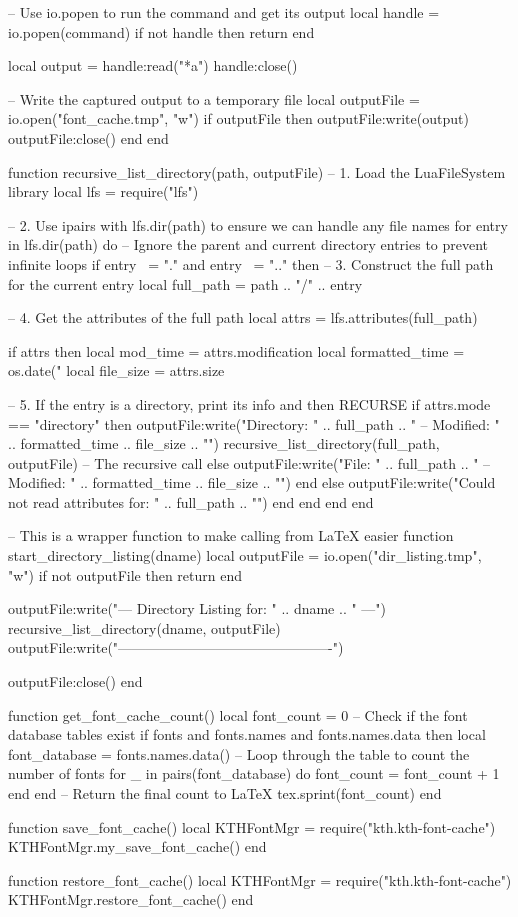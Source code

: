\begin{luacode*}
  -- Use io.popen to run the command and get its output
  local handle = io.popen(command)
  if not handle then return end
  
  local output = handle:read("*a")
  handle:close()
  
  -- Write the captured output to a temporary file
  local outputFile = io.open("font_cache.tmp", "w")
  if outputFile then
    outputFile:write(output)
    outputFile:close()
  end
end

function recursive_list_directory(path, outputFile)
  -- 1. Load the LuaFileSystem library
  local lfs = require("lfs")
  
  -- 2. Use ipairs with lfs.dir(path) to ensure we can handle any file names
  for entry in lfs.dir(path) do
    -- Ignore the parent and current directory entries to prevent infinite loops
    if entry ~= "." and entry ~= ".." then
      -- 3. Construct the full path for the current entry
      local full_path = path .. "/" .. entry
      
      -- 4. Get the attributes of the full path
      local attrs = lfs.attributes(full_path)
      
      if attrs then
        local mod_time = attrs.modification
        local formatted_time = os.date("%
        local file_size = attrs.size
        
        -- 5. If the entry is a directory, print its info and then RECURSE
        if attrs.mode == "directory" then
          outputFile:write("Directory: " .. full_path .. " -- Modified: " .. formatted_time .. file_size .. "\n")
          recursive_list_directory(full_path, outputFile) -- The recursive call
        else
          outputFile:write("File:      " .. full_path .. " -- Modified: " .. formatted_time .. file_size .. "\n")
        end
      else
        outputFile:write("Could not read attributes for: " .. full_path .. "\n")
      end
    end
  end
end

-- This is a wrapper function to make calling from LaTeX easier
function start_directory_listing(dname)
  local outputFile = io.open("dir_listing.tmp", "w")
  if not outputFile then return end
  
  outputFile:write("--- Directory Listing for: " .. dname .. " ---\n")
  recursive_list_directory(dname, outputFile)
  outputFile:write("----------------------------------------------\n")
  
  outputFile:close()
end

function get_font_cache_count()
  local font_count = 0
  -- Check if the font database tables exist
  if fonts and fonts.names and fonts.names.data then
    local font_database = fonts.names.data()
    -- Loop through the table to count the number of fonts
    for _ in pairs(font_database) do
      font_count = font_count + 1
    end
  end
  -- Return the final count to LaTeX
  tex.sprint(font_count)
end

function save_font_cache()
    local KTHFontMgr = require("kth.kth-font-cache")
    KTHFontMgr.my_save_font_cache()
end

function restore_font_cache()
    local KTHFontMgr = require("kth.kth-font-cache")
    KTHFontMgr.restore_font_cache()
end


\end{luacode*}

